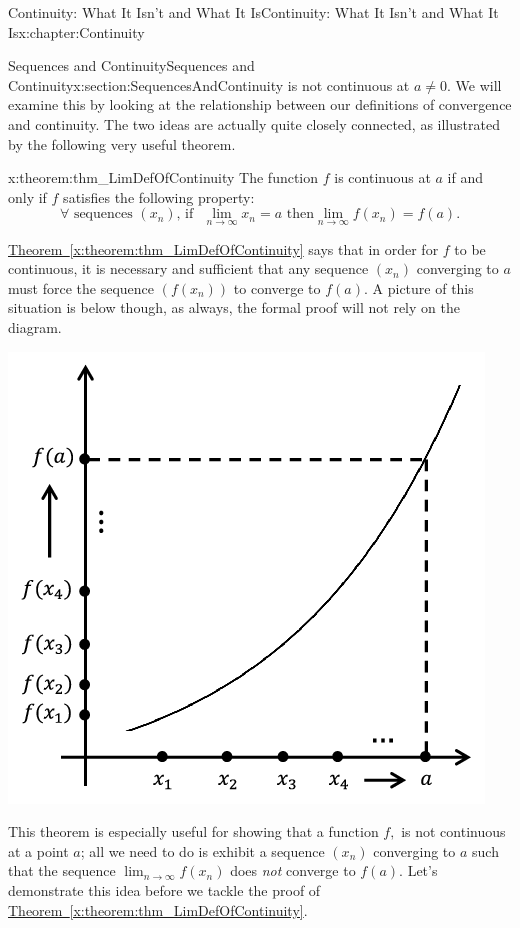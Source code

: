 \begin{chapterptx}{Continuity: What It Isn't and What It Is}{}{Continuity: What It Isn't and What It Is}{}{}{x:chapter:Continuity}
\begin{sectionptx}{Sequences and Continuity}{}{Sequences and Continuity}{}{}{x:section:SequencesAndContinuity}
		is not continuous at \(a\neq 0\).  We will examine this by looking at the relationship between our definitions of convergence and continuity.  The two ideas are actually quite closely connected, as illustrated by the following very useful theorem.%
		\begin{theorem}{}{}{x:theorem:thm_LimDefOfContinuity}%
			 The function \(f\) is continuous at \(a\) if and only if \(f\) satisfies the following property:%
			\begin{equation*}
				\forall\text{ sequences } \left(x_n\right)\text{, if } \,\,\lim_{n\rightarrow\infty}x_n=a \text{ then} \lim_{n\rightarrow\infty}f(x_n)=f(a).{}
			\end{equation*}
		\end{theorem}
		\hyperref[x:theorem:thm_LimDefOfContinuity]{Theorem~{\xreffont\ref{x:theorem:thm_LimDefOfContinuity}}} says that in order for \(f\) to be continuous, it is necessary and sufficient that any sequence \(\left(x_n\right)\) converging to \(a\) must force the sequence \(\left(f(x_n)\right)\) to converge to \(f(a)\).  A picture of this situation is below though, as always, the formal proof will not rely on the diagram.%
		\begin{image}{0.315}{0.37}{0.315}%
			\includegraphics[width=\linewidth]{external/images/Ch5fig6.png}
		\end{image}%
		This theorem is especially useful for showing that a function \(f,\) is not continuous at a point \(a\); all we need to do is exhibit a sequence \(\left(x_n\right)\) converging to \(a\) such that the sequence \(\lim_{n\rightarrow\infty}f(x_n)\) does \emph{not} converge to \(f(a)\).  Let's demonstrate this idea before we tackle the proof of \hyperref[x:theorem:thm_LimDefOfContinuity]{Theorem~{\xreffont\ref{x:theorem:thm_LimDefOfContinuity}}}.%

\end{sectionptx}
\end{chapterptx}
